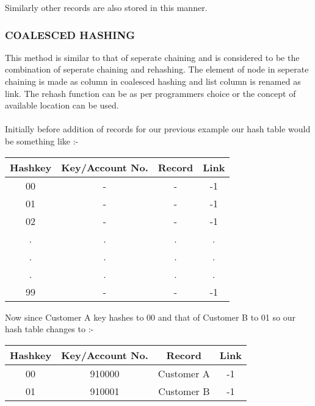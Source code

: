 \documentclass[12pt,a4paper]{article}
\begin{document}
\noindent Similarly other records are also stored in this manner.

\subsubsection{COALESCED HASHING}
This method is similar to that of seperate chaining and is considered to be the combination of seperate chaining and rehashing. The element of node in seperate chaining is made as column in coalesced hashing and list column is renamed as link. The rehash function can be as per programmers choice or the concept of available location can be used. \\ \\
Initially before addition of records for our previous example our hash table would be something like :-

\FloatBarrier
\begin{table}[H]

	\centering	
	\begin{tabular}{|c|c|c|c|} %

	\hline
	\textbf{Hashkey} & \textbf{Key/Account No.} & \textbf{Record} & \textbf{Link} \\

	\hline
	
	00 & - & - & -1 \\
	01 & - & - & -1 \\
	02 & - & - & -1 \\
	. & . & . & . \\
	. & . & . & . \\
	. & . & . & . \\
	99 & - & - & -1 \\

	\hline
	\end{tabular}

\end{table}
\FloatBarrier

\noindent Now since Customer A key hashes to 00 and that of Customer B to 01 so our hash table changes to :-

\FloatBarrier
\begin{table}[H]

	\centering	
	\begin{tabular}{|c|c|c|c|} %

	\hline
	\textbf{Hashkey} & \textbf{Key/Account No.} & \textbf{Record} & \textbf{Link} \\

	\hline
	
	00 & 910000 & Customer A & -1 \\
	01 & 910001 & Customer B & -1 \\

	\hline
	\end{tabular}

\end{table}
\FloatBarrier
\end{document}
